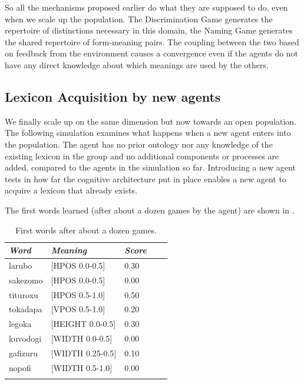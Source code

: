 So all the mechanisms proposed earlier 
do what they are supposed to do, even when we 
scale up the population. The Discrimination 
Game generates the repertoire of distinctions 
necessary in this domain, the Naming Game generates
the shared repertoire of form-meaning pairs. The 
coupling between the two based on feedback from 
the environment causes a convergence even if the
agents do not have any direct knowledge about 
which meanings are used by the others. 

\subsection{Lexicon Acquisition by new agents}

We finally scale up on the same dimension but 
now towards an open population. The following 
simulation examines what happens when a new agent 
enters into the population. The agent has no 
prior ontology nor any knowledge of the existing
lexicon in the group and no additional components
or processes are added, compared to the agents
in the simulation so far. Introducing a new 
agent tests in how far the cognitive architecture
put in place enables a new agent to acquire a 
lexicon that already exists. 

The first words learned (after about a dozen 
games by the agent) are shown in . 
\begin{table}
\begin{center}
\begin{tabular}{ l  l  l  l  l }
\lsptoprule
{\it Word} & {\it Meaning} & {\it Score} \\ \midrule
larubo  & [HPOS 0.0-0.5] & 0.30 \\ \midrule
sakezomo &  [HPOS 0.0-0.5] & 0.00 \\ \midrule
tituroxu &  [HPOS 0.5-1.0] & 0.50 \\ \midrule
tokadapa & [VPOS 0.5-1.0] & 0.20 \\ \midrule
legoka   & [HEIGHT 0.0-0.5] & 0.30 \\ \midrule
kuvodogi  & [WIDTH 0.0-0.5] & 0.00 \\ \midrule
gafizuru &  [WIDTH 0.25-0.5] & 0.10  \\ \midrule
nopofi  & [WIDTH 0.5-1.0] & 0.00 \\ \midrule
\lspbottomrule
\end{tabular}
\caption{\label{tab:first} First words after about a dozen games.}
\end{center}
\end{table}

